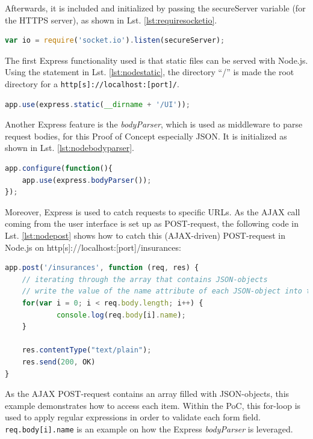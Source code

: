 Afterwards, it is included and initialized by passing the secureServer variable
(for the HTTPS server), as shown in Lst. \ref{lst:requiresocketio}.

\begin{lstlisting}[language=javascript,caption={Initialization of the socket.io module in Node.js},label=lst:requiresocketio]
var io = require('socket.io').listen(secureServer);
\end{lstlisting}

The first Express functionality used is that static files can be served with
Node.js. Using the statement in Lst. \ref{lst:nodestatic}, the directory “/” is made the root
directory for a \texttt{http[s]://localhost:[port]/}.

\begin{lstlisting}[language=javascript,caption={Serving static assets with Express},label=lst:nodestatic]
app.use(express.static(__dirname + '/UI'));
\end{lstlisting}

Another Express feature is the \textit{bodyParser}, which is used as middleware to
parse request bodies, for this Proof of Concept especially JSON. It is initialized as shown in Lst. \ref{lst:nodebodyparser}.

\begin{lstlisting}[language=javascript,caption={Using the bodyParser},label=lst:nodebodyparser]
app.configure(function(){
    app.use(express.bodyParser());
});
\end{lstlisting}

Moreover, Express is used to catch requests to specific URLs. As the AJAX call coming from the user interface is set up as POST-request, the following code in Lst. \ref{lst:nodepost} shows how to catch this (AJAX-driven) POST-request in Node.js on http[s]://localhost:[port]/insurances:

\begin{lstlisting}[language=javascript,caption={Iteration through an array consisting of JSON data},label=lst:nodepost]
app.post('/insurances', function (req, res) {
	// iterating through the array that contains JSON-objects
	// write the value of the name attribute of each JSON-object into the console
	for(var i = 0; i < req.body.length; i++) {
        	console.log(req.body[i].name);
	}

	res.contentType("text/plain");
	res.send(200, OK)
}
\end{lstlisting}

As the AJAX POST-request contains an array filled with JSON-objects, this
example demonstrates how to access each item. Within the PoC, this
for-loop is used to apply regular expressions in order to validate each form
field. \texttt{req.body[i].name} is an example on how the Express \textit{bodyParser} is leveraged.

